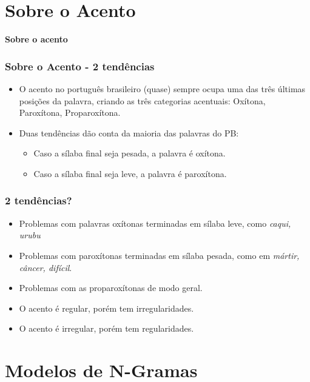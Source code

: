 \documentclass[xcolor=table]{beamer}
\begin{document}

	\section{Sobre o Acento}
	\begin{frame}
		\centering \textbf{Sobre o acento\\}
	\end{frame}
	\begin{frame}
		\frametitle{Sobre o Acento - 2 tendências}
		\begin{itemize}
			\item O acento no português brasileiro (quase) sempre ocupa uma das três últimas posições da palavra, criando as três categorias acentuais: Oxítona, Paroxítona, Proparoxítona.
			\item Duas tendências dão conta da maioria das palavras do PB:
			\begin{itemize}
				\item Caso a sílaba final seja pesada, a palavra é oxítona.\\
				\item Caso a sílaba final seja leve, a palavra é paroxítona.\\
			\end{itemize}
		\end{itemize}
	\end{frame}
	\begin{frame}
		\frametitle{2 tendências?}
		\begin{itemize}
			\item Problemas com palavras oxítonas terminadas em sílaba leve, como \textit{caqui, urubu}\\
			\item Problemas com paroxítonas terminadas em sílaba pesada, como em \textit{mártir, câncer, difícil}.\\
			\item Problemas com as proparoxítonas de modo geral.\\
			\item O acento é regular, porém tem irregularidades.\\
			\item O acento é irregular, porém tem regularidades.\\
		\end{itemize}

	\end{frame}	
	\section{Modelos de N-Gramas}
	
\end{document}
